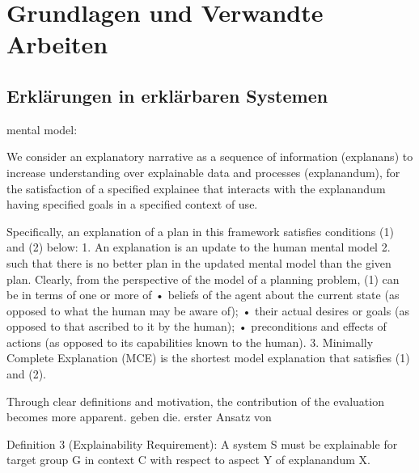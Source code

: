 \chapter{Grundlagen und Verwandte Arbeiten}

\section{Erklärungen in erklärbaren Systemen}
\label{02_basics:explainable_system}

mental model: \cite{chi_three_nodate}

We consider an explanatory narrative as a sequence of information (explanans) to increase understanding over explainable data and processes (explanandum), for the satisfaction of a specified explainee that interacts with the explanandum having specified goals in a specified context of use. \cite{sovrano_modelling_2020}

Specifically, an explanation of a plan in this framework satisfies conditions (1) and (2) below: 1. An explanation is an update to the human mental model 2. such that there is no better plan in the updated mental model than the given plan. Clearly, from the perspective of the model of a planning problem, (1) can be in terms of one or more of • beliefs of the agent about the current state (as opposed to what the human may be aware of); • their actual desires or goals (as opposed to that ascribed to it by the human); • preconditions and effects of actions (as opposed to its capabilities known to the human). 3. Minimally Complete Explanation (MCE) is the shortest model explanation that satisfies (1) and (2). \cite{zahedi_towards_2019}

\glqq Through clear definitions and motivation, the contribution of the evaluation becomes more apparent. \grqq{} \cite{waa_evaluating_2021} \cite{chazette_knowledge_nodate} geben die. erster Ansatz von \cite{kohl_explainability_2019}

Definition 3 (Explainability Requirement): A system S must be explainable for target group G in context C with respect to aspect Y of explanandum X. \cite{kohl_explainability_2019}

\smallskip

\noindent{}

